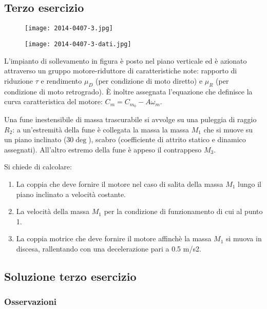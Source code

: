\documentclass[main.tex]{subfiles}
\begin{document}
\subsection{Terzo esercizio}

\begin{figure}[H]
\centering
\texttt{[image: 2014-0407-3.jpg]}
\end{figure}

\begin{figure}[H]
\centering
\texttt{[image: 2014-0407-3-dati.jpg]}
\end{figure}

L’impianto di sollevamento in figura è posto nel piano verticale ed è azionato attraverso un gruppo motore-riduttore di caratteristiche note: rapporto di riduzione $\tau$ e rendimento $\mu_D$ (per condizione di moto diretto) e $\mu_R$ (per condizione di moto retrogrado). È inoltre assegnata l’equazione che definisce la curva caratteristica del motore: $C_m = C_{m_0} - A\omega_m$.

Una fune inestensibile di massa trascurabile si avvolge su una puleggia di raggio $R_2$: a un’estremità della fune è collegata la massa la massa $M_1$ che si muove su un piano inclinato ($30\deg$), scabro (coefficiente di attrito statico e dinamico assegnati). All’altro estremo della fune è appeso il contrappeso $M_3$.

Si chiede di calcolare:
\begin{enumerate}
\item La coppia che deve fornire il motore nel caso di salita della massa $M_1$ lungo il piano inclinato a velocità costante.
\item La velocità della massa $M_1$ per la condizione di funzionamento di cui al punto 1.
\item La coppia motrice che deve fornire il motore affinchè la massa $M_1$ si muova in discesa, rallentando con una decelerazione pari a 0.5 m/s2.
\end{enumerate}

\clearpage

\subsection{Soluzione terzo esercizio}

\subsubsection{Osservazioni}
\end{document}
